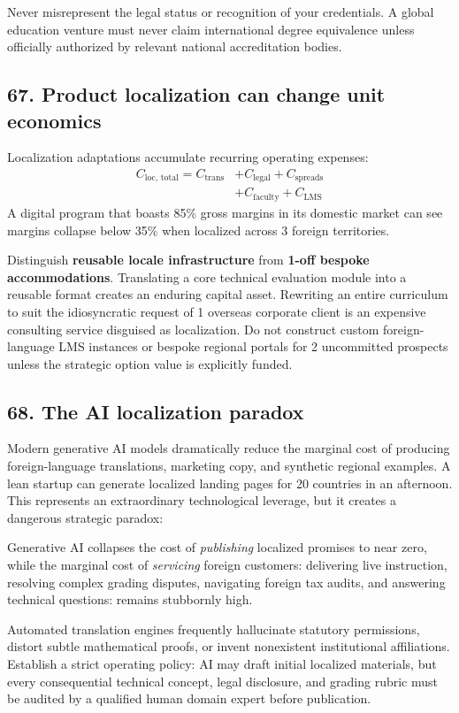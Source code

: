 Never misrepresent the legal status or recognition of your credentials. A global education venture must never claim international degree equivalence unless officially authorized by relevant national accreditation bodies.

\subsection{67. Product localization can change unit economics}

Localization adaptations accumulate recurring operating expenses:
\begin{equation}
\begin{aligned}
C_{\text{loc, total}} = C_{\text{trans}} &+ C_{\text{legal}} + C_{\text{spreads}} \\
&+ C_{\text{faculty}} + C_{\text{LMS}}
\end{aligned}
\end{equation}
A digital program that boasts 85\% gross margins in its domestic market can see margins collapse below 35\% when localized across 3 foreign territories.

Distinguish \textbf{reusable locale infrastructure} from \textbf{1-off bespoke accommodations}. Translating a core technical evaluation module into a reusable format creates an enduring capital asset. Rewriting an entire curriculum to suit the idiosyncratic request of 1 overseas corporate client is an expensive consulting service disguised as localization. Do not construct custom foreign-language LMS instances or bespoke regional portals for 2 uncommitted prospects unless the strategic option value is explicitly funded.

\subsection{68. The AI localization paradox}

Modern generative AI models dramatically reduce the marginal cost of producing foreign-language translations, marketing copy, and synthetic regional examples. A lean startup can generate localized landing pages for 20 countries in an afternoon. This represents an extraordinary technological leverage, but it creates a dangerous strategic paradox:
\begin{tcolorbox}[colback=BayesCanvas,colframe=BayesSecondary,arc=1mm,title=\textbf{The AI Localization Trap}]
Generative AI collapses the cost of \textit{publishing} localized promises to near zero, while the marginal cost of \textit{servicing} foreign customers: delivering live instruction, resolving complex grading disputes, navigating foreign tax audits, and answering technical questions: remains stubbornly high.
\end{tcolorbox}
Automated translation engines frequently hallucinate statutory permissions, distort subtle mathematical proofs, or invent nonexistent institutional affiliations. Establish a strict operating policy: AI may draft initial localized materials, but every consequential technical concept, legal disclosure, and grading rubric must be audited by a qualified human domain expert before publication.

